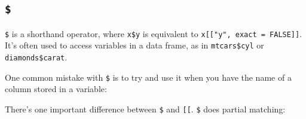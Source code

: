 \begin{itemize}
\begin{Shaded}
\begin{Highlighting}[]
\StringTok{ }\NormalTok{(} \NormalTok{:}\NormalTok{, } \NormalTok{:}\NormalTok{)}
\NormalTok{(df[}\NormalTok{])}
\NormalTok{(df[[}\NormalTok{]])}
\NormalTok{(df[, }\NormalTok{, } \NormalTok{])}
\NormalTok{(df[, }\NormalTok{])}
\end{Highlighting}
\end{Shaded}
\end{itemize}

\subsection{\texttt{\$}}

\texttt{\$} is a shorthand operator, where \texttt{x\$y} is equivalent
to \texttt{x{[}{[}"y", exact = FALSE{]}{]}}. It's often used to access
variables in a data frame, as in \texttt{mtcars\$cyl} or
\texttt{diamonds\$carat}. \indexc{\$} \indexc{[[}

One common mistake with \texttt{\$} is to try and use it when you have
the name of a column stored in a variable:

\begin{Shaded}
\begin{Highlighting}[]

\CommentTok{# Instead use [[}
\end{Highlighting}
\end{Shaded}

There's one important difference between \texttt{\$} and
\texttt{{[}{[}}. \texttt{\$} does partial matching:

\begin{Shaded}
\begin{Highlighting}[]
\StringTok{ }\NormalTok{(} \NormalTok{)}
\NormalTok{x[[}\NormalTok{]]}
\end{Highlighting}
\end{Shaded}

